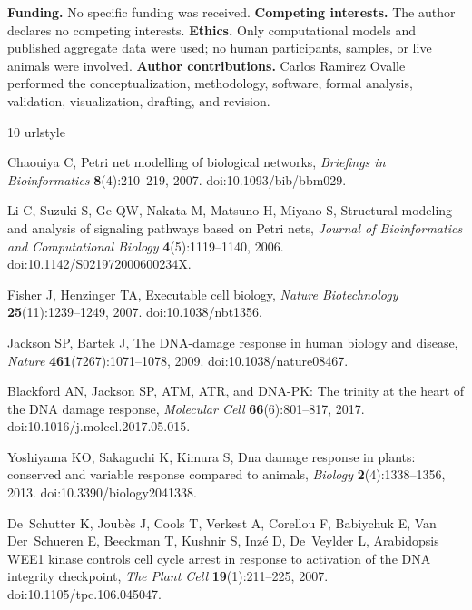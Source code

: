 \documentclass{ws-jbcb}
\numberwithin{equation}{section}
\begin{document}
\noindent\textbf{Funding.} No specific funding was received.
\textbf{Competing interests.} The author declares no competing interests.
\textbf{Ethics.} Only computational models and published aggregate data were
used; no human participants, samples, or live animals were involved.
\textbf{Author contributions.} Carlos Ramirez Ovalle performed the
conceptualization, methodology, software, formal analysis, validation,
visualization, drafting, and revision.

\begin{thebibliography}{10}
\providecommand{\url}[1]{\texttt{#1}}
\providecommand{\urlprefix}{URL }
\expandafter\ifx\csname urlstyle\endcsname\relax
  \providecommand{\doi}[1]{doi:\discretionary{}{}{}#1}\else
  \providecommand{\doi}{doi:\discretionary{}{}{}\begingroup
  \urlstyle{rm}\Url}\fi

Chaouiya C, Petri net modelling of biological networks, \emph{Briefings in
  Bioinformatics} \textbf{8}(4):210--219, 2007.
\newblock \doi{10.1093/bib/bbm029}.

Li C, Suzuki S, Ge QW, Nakata M, Matsuno H, Miyano S, Structural modeling and
  analysis of signaling pathways based on {Petri} nets, \emph{Journal of
  Bioinformatics and Computational Biology} \textbf{4}(5):1119--1140, 2006.
\newblock \doi{10.1142/S021972000600234X}.

Fisher J, Henzinger TA, Executable cell biology, \emph{Nature Biotechnology}
  \textbf{25}(11):1239--1249, 2007.
\newblock \doi{10.1038/nbt1356}.

Jackson SP, Bartek J, The {DNA}-damage response in human biology and disease,
  \emph{Nature} \textbf{461}(7267):1071--1078, 2009.
\newblock \doi{10.1038/nature08467}.

Blackford AN, Jackson SP, {ATM}, {ATR}, and {DNA-PK}: The trinity at the heart
  of the {DNA} damage response, \emph{Molecular Cell} \textbf{66}(6):801--817,
  2017.
\newblock \doi{10.1016/j.molcel.2017.05.015}.

Yoshiyama KO, Sakaguchi K, Kimura S, Dna damage response in plants: conserved
  and variable response compared to animals, \emph{Biology}
  \textbf{2}(4):1338--1356, 2013.
\newblock \doi{10.3390/biology2041338}.

De~Schutter K, Joub{\`e}s J, Cools T, Verkest A, Corellou F, Babiychuk E, Van
  Der~Schueren E, Beeckman T, Kushnir S, Inz{\'e} D, De~Veylder L,
  {Arabidopsis} {WEE1} kinase controls cell cycle arrest in response to
  activation of the {DNA} integrity checkpoint, \emph{The Plant Cell}
  \textbf{19}(1):211--225, 2007.
\newblock \doi{10.1105/tpc.106.045047}.


\end{thebibliography}
\end{document}
